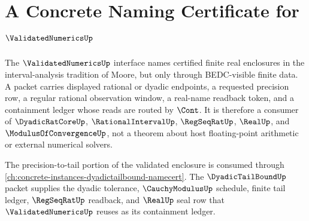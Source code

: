 \chapter{A Concrete Naming Certificate for $\ValidatedNumericsUp$}
\label{ch:concrete-instances-validatednumerics-namecert}

The $\ValidatedNumericsUp$ interface names certified finite real enclosures in
the interval-analysis tradition of Moore, but only through BEDC-visible
finite data. A packet carries displayed rational or dyadic endpoints, a
requested precision row, a regular rational observation window, a real-name
readback token, and a containment ledger whose reads are routed by $\Cont$.
It is therefore a consumer of $\DyadicRatCoreUp$, $\RationalIntervalUp$,
$\RegSeqRatUp$, $\RealUp$, and $\ModulusOfConvergenceUp$, not a theorem about
host floating-point arithmetic or external numerical solvers.

The precision-to-tail portion of the validated enclosure is consumed through
\autoref{ch:concrete-instances-dyadictailbound-namecert}. The
$\DyadicTailBoundUp$ packet supplies the dyadic tolerance,
$\CauchyModulusUp$ schedule, finite tail ledger, $\RegSeqRatUp$ readback, and
$\RealUp$ seal row that $\ValidatedNumericsUp$ reuses as its containment
ledger.

